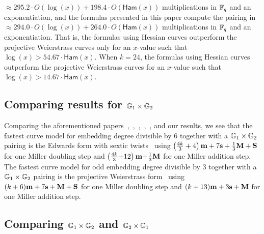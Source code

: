 $\approx 295.2 \cdot O(\log(x)) + 198.4 \cdot O(\mathsf{Ham}(x))$
multiplications in $\mathbb{F}_{q}$ and an exponentiation,
and the formulas presented in this paper compute the pairing in
$\approx 294.0 \cdot O(\log(x)) + 264.0 \cdot O(\mathsf{Ham}(x))$
multiplications in $\mathbb{F}_{q}$ and an exponentiation.
That is, the formulas using Hessian curves outperform the projective Weierstrass curves 
only for an $x$-value such that $\log(x) > 54.67 \cdot \mathsf{Ham}(x)$.
%
When $k = 24$, 
the formulas using Hessian curves outperform the projective Weierstrass curves for an $x$-value such that $\log(x) > 14.67 \cdot \mathsf{Ham}(x)$.

\subsection{Comparing results for $\mathbb{G}_{1} \times \mathbb{G}_{2}$}

Comparing the aforementioned papers~\cite{2008/IonicaJoux08},~\cite{2009/fastertate},~\cite{2009/craig},~\cite{2014/LWZ},~\cite{2010/Gu},
and our results, we see that the fastest curve model for embedding degree divisible by 6 together with a $\mathbb{G}_{1} \times \mathbb{G}_{2}$ pairing
is the Edwards form with sextic twists~\cite{2014/LWZ}
using
$\left(\frac{4k}{3} + 4\right)\textbf{m} + 7\textbf{s} + \frac{1}{3}\textbf{M} + \textbf{S}$
for one Miller doubling step and
$\left(\frac{4k}{3} {+} 12\right)\textbf{m} {+} \frac{1}{3}\textbf{M}$
for one Miller addition step.
The fastest curve model for odd embedding degree divisible by 3 together with a $\mathbb{G}_{1} \times \mathbb{G}_{2}$ pairing
is the projective Weierstrass form~\cite{2009/craig}
using
$(k+6)\textbf{m} + 7\textbf{s} + \textbf{M} + \textbf{S}$
for one Miller doubling step and
$(k+13)\textbf{m} + 3\textbf{s} + \textbf{M}$
for one Miller addition step.


\subsection{Comparing $\mathbb{G}_{1} \times \mathbb{G}_{2}$ and $\mathbb{G}_{2} \times \mathbb{G}_{1}$}

